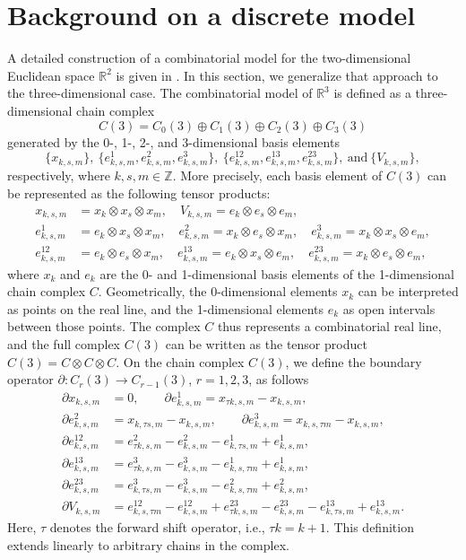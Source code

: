 \documentclass[english]{article}
\theoremstyle{plain}
\theoremstyle{definition}
\theoremstyle{remark}
\numberwithin{equation}{section}
\begin{document}
  \section{Background on a discrete model}
 A detailed construction of a combinatorial model for the two-dimensional Euclidean space
$\mathbb{R}^2$ is given in \cite{S5}. In this section, we generalize that approach to the three-dimensional case.
The combinatorial model of $\mathbb{R}^3$ is defined as a three-dimensional chain complex
\begin{equation*}
C(3)=C_0(3)\oplus C_1(3)\oplus C_2(3)\oplus C_3(3)
\end{equation*}
 generated by the 0-, 1-, 2-, and 3-dimensional basis elements
 \begin{equation*}
 \{x_{k,s,m}\}, \
 \{e_{k,s,m}^1,  e_{k,s,m}^2,  e_{k,s,m}^3\}, \ \{e_{k,s,m}^{12},  e_{k,s,m}^{13},  e_{k,s,m}^{23}\}, \ \mbox{and} \ \{V_{k,s,m}\},
\end{equation*}
 respectively, where $k,  s, m \in {\mathbb Z}$.
More precisely, each basis element of $C(3)$ can be represented as the following tensor products:
\begin{align*}
x_{k,s,m}&=x_k\otimes x_s\otimes x_m, \quad V_{k,s,m}=e_k\otimes e_s\otimes e_m, \\
e_{k,s,m}^1&=e_k\otimes x_s\otimes x_m, \quad e_{k,s,m}^2=x_k\otimes e_s\otimes x_m, \quad e_{k,s,m}^3=x_k\otimes x_s\otimes e_m, \\
e_{k,s,m}^{12}&=e_k\otimes e_s\otimes x_m, \quad e_{k,s,m}^{13}=e_k\otimes x_s\otimes e_m, \quad e_{k,s,m}^{23}=x_k\otimes e_s\otimes e_m,
\end{align*}
where $x_k$ and $e_k$ are the 0- and 1-dimensional basis elements of the 1-dimensional chain complex $C$.
Geometrically, the 0-dimensional elements $x_k$ can be interpreted as points on the real line, and the 1-dimensional elements $e_k$ as open intervals between those points.
The complex $C$ thus represents a combinatorial real line, and the full complex $C(3)$ can be written as the tensor product $C(3)=C\otimes C \otimes C$.
  On the chain complex $C(3)$, we define the boundary operator  $\partial: C_r(3)\rightarrow C_{r-1}(3)$, $r=1,2,3$,
 as follows
\begin{align}\label{2.1}
\partial x_{k,s,m}&=0, \qquad  \partial e_{k,s,m}^1=x_{\tau k,s,m}-x_{k,s,m}, \nonumber \\
  \partial e_{k,s,m}^2&=x_{k, \tau s,m}-x_{k,s,m}, \qquad  \partial e_{k,s,m}^3=x_{k, s, \tau m}-x_{k,s,m},\nonumber \\
\partial e_{k,s,m}^{12}&=e_{\tau k,s,m}^2-e_{k,s,m}^2-e_{k, \tau s,m}^1+e_{ k,s,m}^1, \nonumber \\
 \partial e_{k,s,m}^{13}&=e_{\tau k,s,m}^3-e_{k,s,m}^3-e_{k,  s, \tau m}^1+e_{ k,s,m}^1,
\nonumber \\
\partial e_{k,s,m}^{23}&=e_{ k,\tau s,m}^3-e_{k,s,m}^3-e_{k,  s, \tau m}^2+e_{ k,s,m}^2,
\nonumber \\
\partial V_{k,s,m}&=e_{k,s,\tau m}^{12}-e_{k,s,m}^{12}+e_{\tau k,s,m}^{23}- e_{k,s,m}^{23}-e_{k, \tau s,m}^{13}+e_{k,s,m}^{13}.
\end{align}
Here, $\tau$
 denotes the forward shift operator, i.e., $\tau k=k+1$.
This definition extends linearly to arbitrary chains in the complex.
\end{document}
